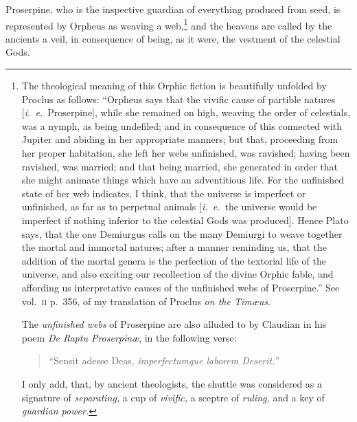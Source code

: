 \documentclass[a4paper,12pt]{article}
\begin{document}
Proserpine, who is the inspective guardian of everything produced from seed, is
represented by Orpheus as weaving a web,\footnote{The theological meaning of
this Orphic fiction is beautifully unfolded by Proclus as follows: ``Orpheus
says that the vivific cause of partible natures [\textit{i.~e.}~Proserpine],
while she remained on high, weaving the order of celestials, was a nymph, as
being undefiled; and in consequence of this connected with Jupiter and abiding
in her appropriate manners; but that, proceeding from her proper habitation,
she left her webs unfinished, was ravished; having been ravished, was married;
and that being married, she generated in order that she might animate things
which have an adventitious life. For the unfinished state of her web indicates,
I think, that the universe is imperfect or unfinished, as far as to perpetual
animals [\textit{i.~e.}~the universe would be imperfect if nothing inferior to
the celestial Gods was produced]. Hence Plato says, that the one Demiurgus
calls on the many Demiurgi to weave together the mortal and immortal natures;
after a manner reminding us, that the addition of the mortal genera is the
perfection of the textorial life of the universe, and also exciting our
recollection of the divine Orphic fable, and affording us interpretative causes
of the unfinished webs of Proserpine.'' See vol.~\textsc{ii} p.~356, of my
translation of Proclus \textit{on the Tim{\ae}us}.

The \textit{unfinished webs} of Proserpine are also alluded to by Claudian in
his poem \textit{De Raptu Proserpin{\ae}}, in the following verse:

\begin{verse}
``Sensit adesse Deas, \textit{imperfectumque laborem Deserit.}''
\end{verse}

I only add, that, by ancient theologists, the shuttle was considered as a
signature of \textit{separating,} a cup of \textit{vivific,} a sceptre of
\textit{ruling,} and a key of \textit{guardian power.}} and the heavens are
called by the ancients a veil, in consequence of being, as it were, the
vestment of the celestial Gods.
\end{document}
